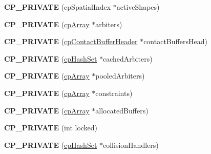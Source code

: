 \begin{DoxyCompactItemize}
\item 
\hypertarget{structcp_space_aeb5b3254155839a0577a95cfc47150f6}{{\bfseries C\-P\-\_\-\-P\-R\-I\-V\-A\-T\-E} (cp\-Spatial\-Index $\ast$active\-Shapes)}\label{structcp_space_aeb5b3254155839a0577a95cfc47150f6}

\item 
\hypertarget{structcp_space_a1f82e9b793400fd3cd711fd8b6157fdf}{{\bfseries C\-P\-\_\-\-P\-R\-I\-V\-A\-T\-E} (\hyperlink{structcp_array}{cp\-Array} $\ast$arbiters)}\label{structcp_space_a1f82e9b793400fd3cd711fd8b6157fdf}

\item 
\hypertarget{structcp_space_a5b64d0a3e66448037ae97094939bbbde}{{\bfseries C\-P\-\_\-\-P\-R\-I\-V\-A\-T\-E} (\hyperlink{structcp_contact_buffer_header}{cp\-Contact\-Buffer\-Header} $\ast$contact\-Buffers\-Head)}\label{structcp_space_a5b64d0a3e66448037ae97094939bbbde}

\item 
\hypertarget{structcp_space_a99ad085e2dee9420cbb015841a6aa180}{{\bfseries C\-P\-\_\-\-P\-R\-I\-V\-A\-T\-E} (\hyperlink{structcp_hash_set}{cp\-Hash\-Set} $\ast$cached\-Arbiters)}\label{structcp_space_a99ad085e2dee9420cbb015841a6aa180}

\item 
\hypertarget{structcp_space_a88069cd1a65978e2121349247451ad3e}{{\bfseries C\-P\-\_\-\-P\-R\-I\-V\-A\-T\-E} (\hyperlink{structcp_array}{cp\-Array} $\ast$pooled\-Arbiters)}\label{structcp_space_a88069cd1a65978e2121349247451ad3e}

\item 
\hypertarget{structcp_space_a0ee26e44dd103669b73052675cbf1e23}{{\bfseries C\-P\-\_\-\-P\-R\-I\-V\-A\-T\-E} (\hyperlink{structcp_array}{cp\-Array} $\ast$constraints)}\label{structcp_space_a0ee26e44dd103669b73052675cbf1e23}

\item 
\hypertarget{structcp_space_a845d16ad7d74a1d003b4a3a7c22c167e}{{\bfseries C\-P\-\_\-\-P\-R\-I\-V\-A\-T\-E} (\hyperlink{structcp_array}{cp\-Array} $\ast$allocated\-Buffers)}\label{structcp_space_a845d16ad7d74a1d003b4a3a7c22c167e}

\item 
\hypertarget{structcp_space_a55611cae882c3e92add352cf39f12c76}{{\bfseries C\-P\-\_\-\-P\-R\-I\-V\-A\-T\-E} (int locked)}\label{structcp_space_a55611cae882c3e92add352cf39f12c76}

\item 
\hypertarget{structcp_space_a0a4279c91adbb813a74923a7c371a482}{{\bfseries C\-P\-\_\-\-P\-R\-I\-V\-A\-T\-E} (\hyperlink{structcp_hash_set}{cp\-Hash\-Set} $\ast$collision\-Handlers)}\label{structcp_space_a0a4279c91adbb813a74923a7c371a482}


\end{DoxyCompactItemize}
